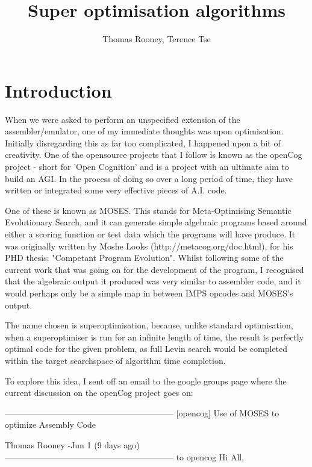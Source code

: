 \documentclass[11pt]{article}
\begin{document}
\title{Super optimisation algorithms}
\author{Thomas Rooney, Terence Tse}

\maketitle

\section{Introduction}

When we were asked to perform an unspecified extension of the assembler/emulator, one of my immediate thoughts was upon optimisation. Initially disregarding this as far too complicated, I happened upon a bit of creativity. One of the opensource projects that I follow is known as the openCog project - short for 'Open Cognition' and is a project with an ultimate aim to build an AGI. In the process of doing so over a long period of time, they have written or integrated some very effective pieces of A.I. code. 

One of these is known as MOSES. This stands for Meta-Optimising Semantic Evolutionary Search, and it can generate simple algebraic programs based around either a scoring function or test data which the programs will have produce. It was originally written by Moshe Looks (http://metacog.org/doc.html), for his PHD thesis: "Competant Program Evolution". Whilst following some of the current work that was going on for the development of the program, I recognised that the algebraic output it produced was very similar to assembler code, and it would perhaps only be a simple map in between IMPS opcodes and MOSES's output. 

The name chosen is superoptimisation, because, unlike standard optimisation, when a superoptimiser is run for an infinite length of time, the result is perfectly optimal code for the given problem, as full Levin search would be completed within the target searchspace of algorithm time completion.

To explore this idea, I sent off an email to the google groups page where the current discussion on the openCog project goes on:

------------------------------------------------------------
[opencog] Use of MOSES to optimize Assembly Code

Thomas Rooney
-Jun 1 (9 days ago)
------------------------------------------------------------
to opencog 
Hi All,
\end{document}
